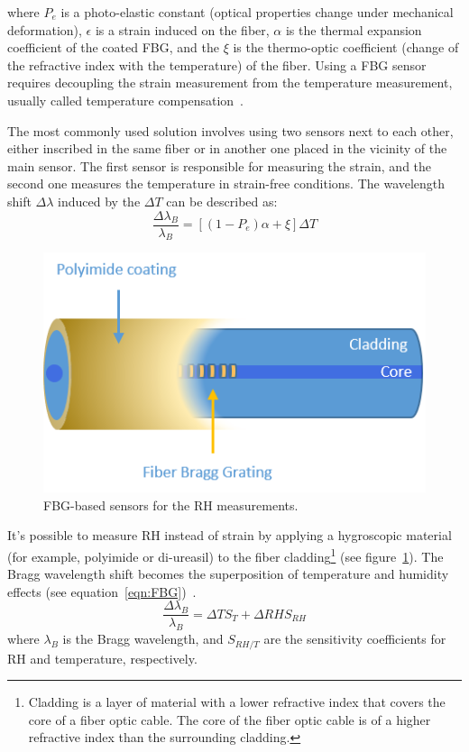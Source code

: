 where $P_{e}$ is a photo-elastic constant (optical properties change under mechanical deformation), $\epsilon$ is a strain induced on the fiber, $\alpha$ is the thermal expansion coefficient of the coated \gls{FBG}, and the $\xi$ is the thermo-optic coefficient (change of the refractive index with the temperature) of the fiber. Using a \gls{FBG} sensor requires decoupling the strain measurement from the temperature measurement, usually called temperature compensation~\cite{Yun-Jiang_Rao_1997}. 

The most commonly used solution involves using two sensors next to each other, either inscribed in the same fiber or in another one placed in the vicinity of the main sensor. The first sensor is responsible for measuring the strain, and the second one measures the temperature in strain-free conditions. The wavelength shift $\Delta \lambda$ induced by the $\Delta T$ can be described as:
\begin{equation}
    \frac{\Delta\lambda_{B}}{\lambda_{B}}=\left [(1-P_{e}) \alpha + \xi  \right ] \Delta T
\end{equation}


\begin{figure}[!h]
\centering
\includegraphics[width=0.45\columnwidth]{Chapter5/images/Picture1.png}
\caption{FBG-based sensors for the RH measurements.}
\label{fig:fbg_scheme}
\end{figure}


It's possible to measure RH instead of strain by applying a hygroscopic material (for example, polyimide or di-ureasil) to the fiber cladding\footnote{Cladding is a layer of material with a lower refractive index that covers the core of a fiber optic cable. The core of the fiber optic cable is of a higher refractive index than the surrounding cladding.} (see figure~\ref{fig:fbg_scheme}). The Bragg wavelength shift becomes the superposition of temperature and humidity effects (see equation~\ref{eqn:FBG})~\cite{Kronenberg:02, YEO_PI}. 
                             \begin{equation}\label{eqn:FBG}
                                    \frac{\Delta\lambda_{B}}{\lambda_{B}}=\Delta TS_{T}+\Delta RHS_{RH}
                            \end{equation}
                            where $\lambda_{B}$ is the Bragg wavelength, and $S_{RH/T}$ are the sensitivity coefficients for RH and temperature, respectively. 

